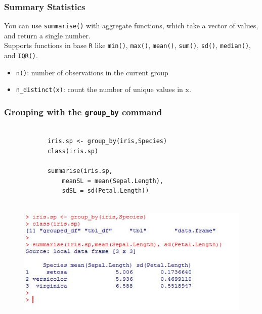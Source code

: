 \documentclass{beamer}
\begin{document}
	\begin{frame}
		\frametitle{Summary Statistics}
		\large
		You can use \texttt{summarise()} with aggregate functions, which take a vector of values, and return a single number.\\ \bigskip Supports functions in base \texttt{R} like \texttt{min()}, \texttt{max()}, \texttt{mean()}, \texttt{sum()}, \texttt{sd()}, \texttt{median()}, and \texttt{IQR()}.\\ \bigskip 
		\begin{itemize}
			\item 
			\texttt{n()}: number of observations in the current group
			\item 
			\texttt{n\_distinct(x)}: count the number of unique values in x.
		\end{itemize}
		
	\end{frame}
	\begin{frame}[fragile]
		\frametitle{Grouping with the \texttt{group\_by} command}
		\large
		\vspace{-1cm}
		\begin{framed}
			\begin{verbatim}
			
			iris.sp <- group_by(iris,Species)
			class(iris.sp)
			
			summarise(iris.sp,
			    meanSL = mean(Sepal.Length), 
			    sdSL = sd(Petal.Length))
			
			\end{verbatim}
		\end{framed}
	\end{frame}
	\begin{frame}
		\begin{figure}
			\centering
			\includegraphics[width=1.05\linewidth]{images/irisgroupby}
		\end{figure}
	\end{frame}	
\end{document}
